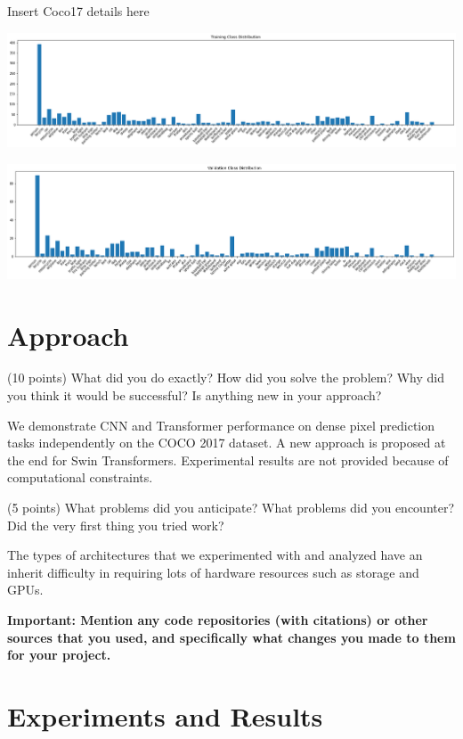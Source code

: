 \documentclass[10pt,twocolumn,letterpaper]{article}
\begin{document}
Insert Coco17 details here

\includegraphics[width=0.8\linewidth]{docs/latex/images/coco17_train_trunc.png}
\caption{}

\includegraphics[width=0.8\linewidth]{docs/latex/images/coco17_val_trunc.png}
\caption{}

\section{Approach}

(10 points) What did you do exactly? How did you solve the problem? Why did you think it would be successful? Is anything new in your approach?

We demonstrate CNN and Transformer performance on dense pixel prediction tasks independently on the COCO 2017 dataset. A new approach is proposed at the end for Swin Transformers. Experimental results are not provided because of computational constraints.

(5 points) What problems did you anticipate? What problems did you encounter? Did the very first thing you tried work?

The types of architectures that we experimented with and analyzed have an inherit difficulty in requiring lots of hardware resources such as storage and GPUs.

\textbf{Important: Mention any code repositories (with citations) or other sources that you used, and specifically what changes you made to them for your project. }

\section{Experiments and Results}
\end{document}

